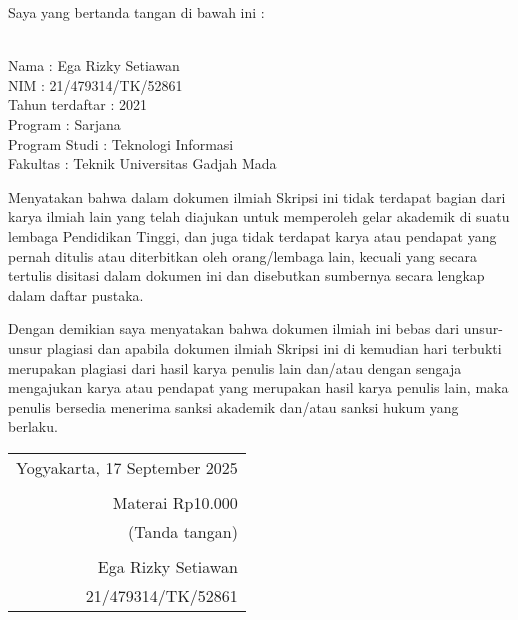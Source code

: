 \noindent Saya yang bertanda tangan di bawah ini :

\vspace{-1em}

\begin{tabbing}
	\hspace{40mm} \= \\ %
	\noindent Nama \> : Ega Rizky Setiawan\\[\parskip]
	\noindent NIM \> : 21/479314/TK/52861 \\[\parskip]
	\noindent Tahun terdaftar \> : 2021 \\[\parskip]
	\noindent Program \> : Sarjana \\[\parskip]
	\noindent Program Studi \> : Teknologi Informasi \\[\parskip]
	\noindent Fakultas \> : Teknik Universitas Gadjah Mada
\end{tabbing}

\noindent Menyatakan bahwa dalam dokumen ilmiah Skripsi ini tidak terdapat bagian dari karya ilmiah lain yang telah diajukan untuk memperoleh gelar akademik di suatu lembaga Pendidikan Tinggi, dan juga tidak terdapat karya atau pendapat yang pernah ditulis atau diterbitkan oleh orang/lembaga lain, kecuali yang secara tertulis disitasi dalam dokumen ini dan disebutkan sumbernya secara lengkap dalam daftar pustaka.

\noindent Dengan demikian saya menyatakan bahwa dokumen ilmiah ini bebas dari unsur-unsur plagiasi dan apabila dokumen ilmiah Skripsi ini di kemudian hari terbukti merupakan plagiasi dari hasil karya penulis lain dan/atau dengan sengaja mengajukan karya atau pendapat yang merupakan hasil karya penulis lain, maka penulis bersedia menerima sanksi akademik dan/atau sanksi hukum yang berlaku.


\begin{flushright}
	\begin{tabular}{r}
		Yogyakarta, 17 September 2025 \\
		\vspace{0.1cm}                \\
		\tiny{Materai Rp10.000}       \\
		\tiny{(Tanda tangan)}         \\
		\vspace{0.1cm}                \\
		Ega Rizky Setiawan            \\ 21/479314/TK/52861
	\end{tabular}
\end{flushright}